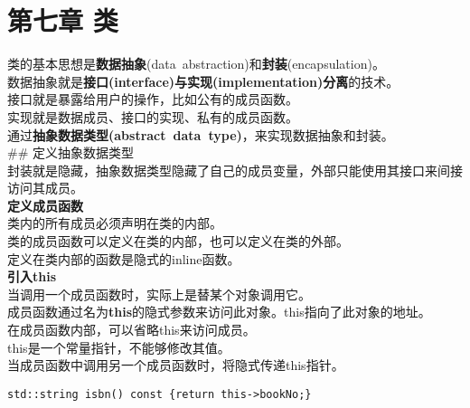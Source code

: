\documentclass[
  a4paper,
  oneside,tablecaptionabove
]{scrbook}
\begin{document}
\chapter{第七章 类}\label{ux7b2cux4e03ux7ae0-ux7c7b}

类的基本思想是\textbf{数据抽象}(data~abstraction)和\textbf{封装}(encapsulation)。\\
数据抽象就是\textbf{接口(interface)与实现(implementation)分离}的技术。\\
接口就是暴露给用户的操作，比如公有的成员函数。\\
实现就是数据成员、接口的实现、私有的成员函数。\\
通过\textbf{抽象数据类型(abstract~data~type)}，来实现数据抽象和封装。\\
\#\# 定义抽象数据类型\\
封装就是隐藏，抽象数据类型隐藏了自己的成员变量，外部只能使用其接口来间接访问其成员。\\
\textbf{定义成员函数}\\
类内的所有成员必须声明在类的内部。\\
类的成员函数可以定义在类的内部，也可以定义在类的外部。\\
定义在类内部的函数是隐式的inline函数。\\
\textbf{引入this}\\
当调用一个成员函数时，实际上是替某个对象调用它。\\
成员函数通过名为\textbf{this}的隐式参数来访问此对象。this指向了此对象的地址。\\
在成员函数内部，可以省略this来访问成员。\\
this是一个常量指针，不能够修改其值。\\
当成员函数中调用另一个成员函数时，将隐式传递this指针。

\begin{lstlisting}
std::string isbn() const {return this->bookNo;}
\end{lstlisting}
\end{document}
